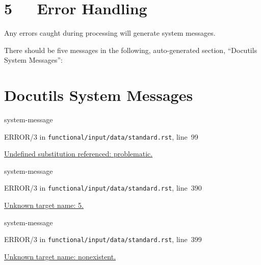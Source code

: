 \documentclass[a4paper]{article}
\begin{document}


\section{5   Error Handling%
  \label{error-handling}%
}

Any errors caught during processing will generate system messages.

There should be five messages in the following, auto-generated
section, “Docutils System Messages”:



\section[Docutils System Messages]{\color{red}Docutils System Messages}

\begin{DUclass}{system-message}
\begin{DUadmonition}

ERROR/3 in \texttt{functional/input/data/standard.rst}, line~99

\hyperlink{problematic-1}{
Undefined substitution referenced: \textquotedbl{}problematic\textquotedbl{}.
}
\end{DUadmonition}
\end{DUclass}

\begin{DUclass}{system-message}
\begin{DUadmonition}

ERROR/3 in \texttt{functional/input/data/standard.rst}, line~390

\hyperlink{footnote-reference-8}{
Unknown target name: \textquotedbl{}5\textquotedbl{}.
}
\end{DUadmonition}
\end{DUclass}

\begin{DUclass}{system-message}
\begin{DUadmonition}

ERROR/3 in \texttt{functional/input/data/standard.rst}, line~399

\hyperlink{citation-reference-3}{
Unknown target name: \textquotedbl{}nonexistent\textquotedbl{}.
}
\end{DUadmonition}
\end{DUclass}
\end{document}
